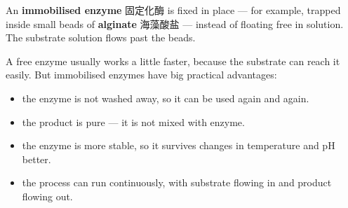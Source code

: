 \documentclass[11pt]{article}
\begin{document}
An \textbf{immobilised enzyme} 固定化酶 is fixed in place — for example, trapped inside small beads of \textbf{alginate} 海藻酸盐 — instead of floating free in solution. The substrate solution flows past the beads.

A free enzyme usually works a little faster, because the substrate can reach it easily. But immobilised enzymes have big practical advantages:

\begin{itemize}
\item the enzyme is not washed away, so it can be used again and again.

\item the product is pure — it is not mixed with enzyme.

\item the enzyme is more stable, so it survives changes in temperature and pH better.

\item the process can run continuously, with substrate flowing in and product flowing out.

\end{itemize}
\end{document}
